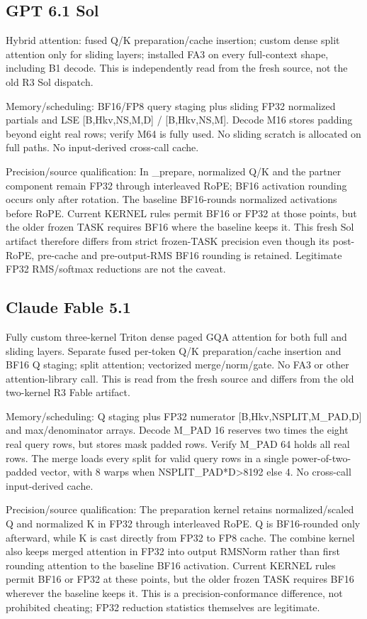 \documentclass[11pt,letterpaper]{article}
\begin{document}
\subsection*{GPT 6.1 Sol}

Hybrid attention: fused Q/K preparation/cache insertion; custom dense split attention only for sliding layers; installed FA3 on every full-context shape, including B1 decode. This is independently read from the fresh source, not the old R3 Sol dispatch.

Memory/scheduling: BF16/FP8 query staging plus sliding FP32 normalized partials and LSE [B,Hkv,NS,M,D] / [B,Hkv,NS,M]. Decode M16 stores padding beyond eight real rows; verify M64 is fully used. No sliding scratch is allocated on full paths. No input-derived cross-call cache.

Precision/source qualification: In \_prepare, normalized Q/K and the partner component remain FP32 through interleaved RoPE; BF16 activation rounding occurs only after rotation. The baseline BF16-rounds normalized activations before RoPE. Current KERNEL rules permit BF16 or FP32 at those points, but the older frozen TASK requires BF16 where the baseline keeps it. This fresh Sol artifact therefore differs from strict frozen-TASK precision even though its post-RoPE, pre-cache and pre-output-RMS BF16 rounding is retained. Legitimate FP32 RMS/softmax reductions are not the caveat.

\subsection*{Claude Fable 5.1}

Fully custom three-kernel Triton dense paged GQA attention for both full and sliding layers. Separate fused per-token Q/K preparation/cache insertion and BF16 Q staging; split attention; vectorized merge/norm/gate. No FA3 or other attention-library call. This is read from the fresh source and differs from the old two-kernel R3 Fable artifact.

Memory/scheduling: Q staging plus FP32 numerator [B,Hkv,NSPLIT,M\_PAD,D] and max/denominator arrays. Decode M\_PAD 16 reserves two times the eight real query rows, but stores mask padded rows. Verify M\_PAD 64 holds all real rows. The merge loads every split for valid query rows in a single power-of-two-padded vector, with 8 warps when NSPLIT\_PAD*D\textgreater{}8192 else 4. No cross-call input-derived cache.

Precision/source qualification: The preparation kernel retains normalized/scaled Q and normalized K in FP32 through interleaved RoPE. Q is BF16-rounded only afterward, while K is cast directly from FP32 to FP8 cache. The combine kernel also keeps merged attention in FP32 into output RMSNorm rather than first rounding attention to the baseline BF16 activation. Current KERNEL rules permit BF16 or FP32 at these points, but the older frozen TASK requires BF16 wherever the baseline keeps it. This is a precision-conformance difference, not prohibited cheating; FP32 reduction statistics themselves are legitimate.
\end{document}
